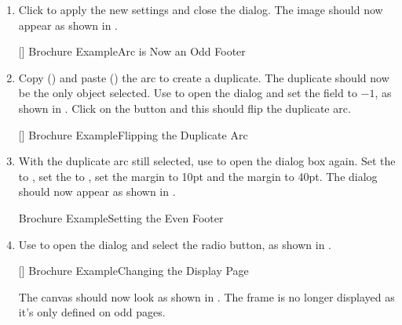 \begin{enumerate}
{
  {fig:brochure11a}{}{},
  {fig:brochure11b}{}{}
}
[Brochure Example\dash Setting The Odd Footer]
{Brochure Example\dash Setting the odd footer:
 entering the frame contents;
 the frame settings.}

\item Click  to apply the new settings and close the dialog. The
image should now appear as shown in .

[]
{}
{Brochure Example\dash Arc is Now an Odd Footer}

\item Copy () and paste
() the arc to create a
duplicate. The duplicate should now be the only \gls{object}
selected. Use  to open the
 dialog and set the
 field to $-1$, as shown in
. Click on the  button and this should
flip the duplicate arc.

[]
{}
{Brochure Example\dash Flipping the Duplicate Arc}

\item With the duplicate arc still selected, use
 to open the
 dialog box again. Set the
 to , set the
 to
, set the
 margin to 10\gls{pt} and the
 margin to 40\gls*{pt}.
The dialog should now appear as shown in .

{}
{Brochure Example\dash Setting the Even Footer}

\item Use  to open the
 dialog and select the
 radio button, as shown in
.

[]
{}
{Brochure Example\dash Changing the Display Page}

The \gls{canvas} should now look as shown in
. The  frame is no longer
displayed as it's only defined on odd pages.


\end{enumerate}
